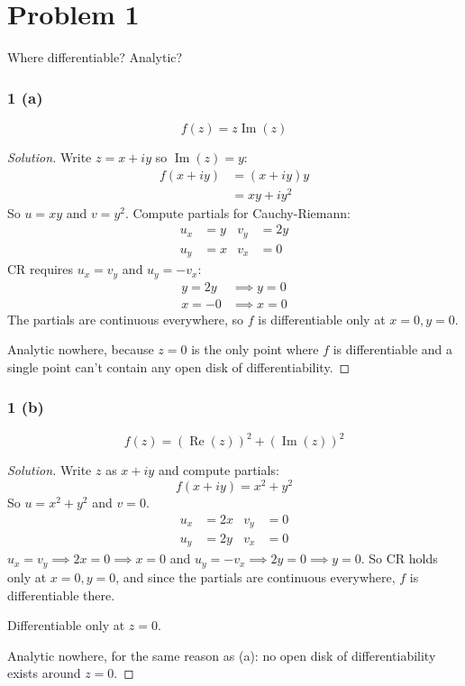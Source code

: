 \documentclass{article}
\newenvironment{solution}{
\begin{proof}[Solution]}{
\end{proof}}
\begin{document}
\section*{Problem 1}
Where differentiable? Analytic?

\subsubsection*{1 (a)}
\[
  f(z) = z \operatorname{Im}(z)
\]
\begin{solution}
  Write $z = x + iy$ so $\operatorname{Im}(z) = y$:
  \begin{align*}
    f(x + iy)
    &= (x + iy)y
    \\ &= xy + iy^2
  \end{align*}
  So $u = xy$ and $v = y^2$. Compute partials for Cauchy-Riemann:
  \begin{align*}
    u_x &= y & v_y &= 2y
    \\ u_y &= x & v_x &= 0
  \end{align*}
  CR requires $u_x = v_y$ and $u_y = -v_x$:
  \begin{align*}
    y = 2y &\implies y = 0
    \\ x = -0 &\implies x = 0
  \end{align*}
  The partials are continuous everywhere, so $f$ is differentiable only at
  $x = 0, y = 0$.

  Analytic nowhere, because $z = 0$ is the only point where $f$ is
  differentiable and a single point can't contain any open disk of
  differentiability.
\end{solution}

\subsubsection*{1 (b)}
\[
  f(z) = \left(\operatorname{Re}(z)\right)^2 + \left(\operatorname{Im}(z)\right)^2
\]
\begin{solution}
  Write $z$ as $x + iy$ and compute partials:
  \[
    f(x + iy) = x^2 + y^2
  \]
  So $u = x^2 + y^2$ and $v = 0$.
  \begin{align*}
    u_x &= 2x & v_y &= 0
    \\ u_y &= 2y & v_x &= 0
  \end{align*}
  $u_x = v_y \implies 2x = 0 \implies x = 0$ and
  $u_y = -v_x \implies 2y = 0 \implies y = 0$. So CR holds only at
  $x = 0, y = 0$, and since the partials are continuous everywhere, $f$ is
  differentiable there.

  Differentiable only at $z = 0$.

  Analytic nowhere, for the same reason as (a): no open disk of
  differentiability exists around $z = 0$.
\end{solution}
\end{document}
